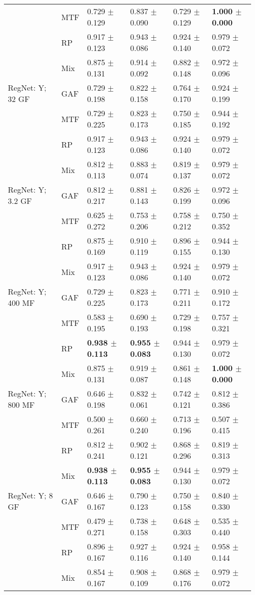 \begin{longtable}[t]{llllll}
 & MTF & 0.729 $\pm$ 0.129 & 0.837 $\pm$ 0.090 & 0.729 $\pm$ 0.129 & \textbf{1.000 $\pm$ 0.000} \\
 & RP & 0.917 $\pm$ 0.123 & 0.943 $\pm$ 0.086 & 0.924 $\pm$ 0.140 & 0.979 $\pm$ 0.072 \\
 & Mix & 0.875 $\pm$ 0.131 & 0.914 $\pm$ 0.092 & 0.882 $\pm$ 0.148 & 0.972 $\pm$ 0.096 \\
RegNet: Y; 32 GF & GAF & 0.729 $\pm$ 0.198 & 0.822 $\pm$ 0.158 & 0.764 $\pm$ 0.170 & 0.924 $\pm$ 0.199 \\
 & MTF & 0.729 $\pm$ 0.225 & 0.823 $\pm$ 0.173 & 0.750 $\pm$ 0.185 & 0.944 $\pm$ 0.192 \\
 & RP & 0.917 $\pm$ 0.123 & 0.943 $\pm$ 0.086 & 0.924 $\pm$ 0.140 & 0.979 $\pm$ 0.072 \\
 & Mix & 0.812 $\pm$ 0.113 & 0.883 $\pm$ 0.074 & 0.819 $\pm$ 0.137 & 0.979 $\pm$ 0.072 \\
RegNet: Y; 3.2 GF & GAF & 0.812 $\pm$ 0.217 & 0.881 $\pm$ 0.143 & 0.826 $\pm$ 0.199 & 0.972 $\pm$ 0.096 \\
 & MTF & 0.625 $\pm$ 0.272 & 0.753 $\pm$ 0.206 & 0.758 $\pm$ 0.212 & 0.750 $\pm$ 0.352 \\
 & RP & 0.875 $\pm$ 0.169 & 0.910 $\pm$ 0.119 & 0.896 $\pm$ 0.155 & 0.944 $\pm$ 0.130 \\
 & Mix & 0.917 $\pm$ 0.123 & 0.943 $\pm$ 0.086 & 0.924 $\pm$ 0.140 & 0.979 $\pm$ 0.072 \\
RegNet: Y; 400 MF & GAF & 0.729 $\pm$ 0.225 & 0.823 $\pm$ 0.173 & 0.771 $\pm$ 0.211 & 0.910 $\pm$ 0.172 \\
 & MTF & 0.583 $\pm$ 0.195 & 0.690 $\pm$ 0.193 & 0.729 $\pm$ 0.198 & 0.757 $\pm$ 0.321 \\
 & RP & \textbf{0.938 $\pm$ 0.113} & \textbf{0.955 $\pm$ 0.083} & 0.944 $\pm$ 0.130 & 0.979 $\pm$ 0.072 \\
 & Mix & 0.875 $\pm$ 0.131 & 0.919 $\pm$ 0.087 & 0.861 $\pm$ 0.148 & \textbf{1.000 $\pm$ 0.000} \\
RegNet: Y; 800 MF & GAF & 0.646 $\pm$ 0.198 & 0.832 $\pm$ 0.061 & 0.742 $\pm$ 0.121 & 0.812 $\pm$ 0.386 \\
 & MTF & 0.500 $\pm$ 0.261 & 0.660 $\pm$ 0.240 & 0.713 $\pm$ 0.196 & 0.507 $\pm$ 0.415 \\
 & RP & 0.812 $\pm$ 0.241 & 0.902 $\pm$ 0.121 & 0.868 $\pm$ 0.296 & 0.819 $\pm$ 0.313 \\
 & Mix & \textbf{0.938 $\pm$ 0.113} & \textbf{0.955 $\pm$ 0.083} & 0.944 $\pm$ 0.130 & 0.979 $\pm$ 0.072 \\
RegNet: Y; 8 GF & GAF & 0.646 $\pm$ 0.167 & 0.790 $\pm$ 0.123 & 0.750 $\pm$ 0.158 & 0.840 $\pm$ 0.330 \\
 & MTF & 0.479 $\pm$ 0.271 & 0.738 $\pm$ 0.158 & 0.648 $\pm$ 0.303 & 0.535 $\pm$ 0.440 \\
 & RP & 0.896 $\pm$ 0.167 & 0.927 $\pm$ 0.116 & 0.924 $\pm$ 0.140 & 0.958 $\pm$ 0.144 \\
 & Mix & 0.854 $\pm$ 0.167 & 0.908 $\pm$ 0.109 & 0.868 $\pm$ 0.176 & 0.979 $\pm$ 0.072 \\
\end{longtable}
